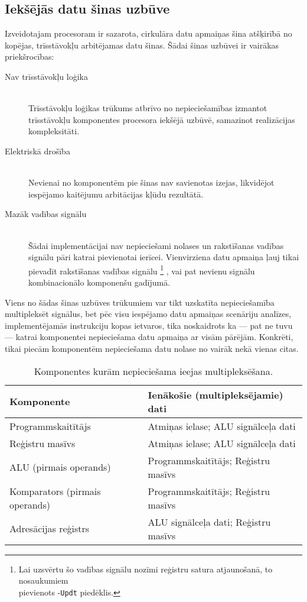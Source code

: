 \subsection{Iekšējās datu šinas uzbūve} \label{sec:databus}
Izveidotajam procesoram ir sazarota, cirkulāra datu apmaiņas šina atšķirībā no kopējas,
trīsstāvokļu arbitējamas datu šinas. Šādai šinas uzbūvei ir vairākas
priekšrocības:
\begin{description}
	\item[Nav trīsstāvokļu loģika] \hfill \\
		Trīsstāvokļu loģikas trūkums atbrīvo no nepieciešamības izmantot
		trīsstāvokļu komponentes procesora iekšējā uzbūvē,
		samazinot realizācijas kompleksitāti.
	\item[Elektriskā drošība] \hfill \\ %
		Nevienai no komponentēm pie šinas nav savienotas izejas,
		likvidējot iespējamo kaitējumu arbitācijas kļūdu rezultātā.
	\item[Mazāk vadības signālu] \hfill \\
		Šādai implementācijai nav nepieciešami nolases un rakstīšanas
		vadības signālu pāri katrai pievienotai ierīcei. Vienvirziena datu
		apmaiņa ļauj tikai pievadīt rakstīšanas vadības signālu%
		\footnote{Lai uzsvērtu šo vadības signālu nozīmi reģistru satura
			atjaunošanā, to nosaukumiem\\ pievienots -\texttt{Updt} piedēklis.}%
		, vai pat nevienu signālu kombinacionālo komponenšu gadījumā.
\end{description}

Viens no šādas šinas uzbūves trūkumiem var tikt uzskatīta nepieciešamība
multipleksēt signālus, bet pēc visu iespējamo datu apmaiņas scenāriju analīzes,
implementējamās instrukciju kopas ietvaros, tika noskaidrots ka --- 
pat ne tuvu --- katrai komponentei nepieciešama datu apmaiņa ar visām pārējām.
Konkrēti, tikai piecām komponentēm nepieciešama datu nolase no vairāk
nekā vienas citas.

\begin{table}[thb]
	\centering
	\caption{Komponentes kurām nepieciešama ieejas multipleksēšana.}
	\label{tbl:muxes}
	\begin{tabular}{ll}
		\toprule
		Komponente & Ienākošie (multipleksējamie) dati\\ 
		\midrule
		Programmskaitītājs & Atmiņas ielase; ALU signālceļa dati\\
		Reģistru masīvs & Atmiņas ielase; ALU signālceļa dati\\
		ALU (pirmais operands) & Programmskaitītājs; Reģistru masīvs\\
		Komparators (pirmais operands) & Programmskaitītājs; Reģistru masīvs\\
		Adresācijas reģistrs & ALU signālceļa dati; Reģistru masīvs\\
		\bottomrule
	\end{tabular}
\end{table}

